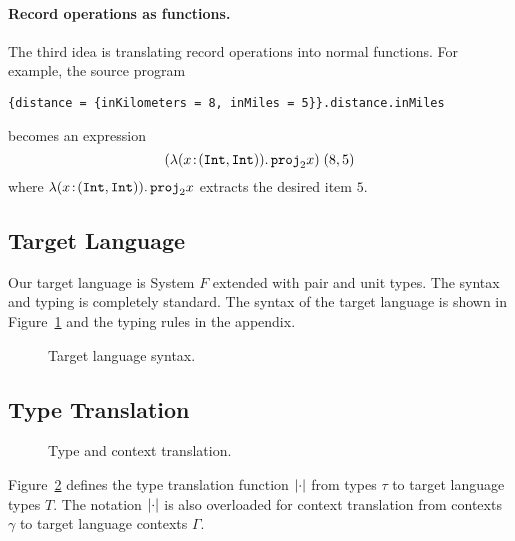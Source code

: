 \paragraph{Record operations as functions.}
The third idea is translating record operations into normal functions. For
example, the source program
\begin{lstlisting}
{distance = {inKilometers = 8, inMiles = 5}}.distance.inMiles
\end{lstlisting}
becomes an \name expression
\[
(\lambda (x \!:\! (\texttt {Int}, \texttt {Int})).\, {\texttt {proj}}_{2} x) \; (8, 5)
\]
where $\lambda (x \!:\! (\texttt {Int}, \texttt {Int})).\, {\texttt {proj}}_{2} x$
extracts the desired item $5$.

\subsection{Target Language}

Our target language is System $F$ extended with pair and unit types. The syntax
and typing is completely standard. The syntax of the target language is shown in
Figure~\ref{fig:f-syntax} and the typing rules in the appendix.
\begin{figure}[h]
  
  \caption{Target language syntax.}
  \label{fig:f-syntax}
\end{figure}



\subsection{Type Translation}

\begin{figure}[h]
  
  
  \caption{Type and context translation.}
  \label{fig:type-and-context-translation}
\end{figure}

Figure~\ref{fig:type-and-context-translation} defines the type translation
function $\lvert \cdot \rvert$ from \name types $\tau$ to target language types $T$. The
notation $\lvert \cdot \rvert$ is also overloaded for context translation from \name
contexts $\gamma$ to target language contexts $\Gamma$.

